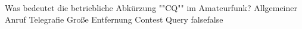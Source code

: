     {Was bedeutet die betriebliche Abkürzung ""CQ"" im Amateurfunk?}
    {Allgemeiner Anruf}
    {Telegrafie}
    {Große Entfernung}
    {Contest Query}
    {false}{false}